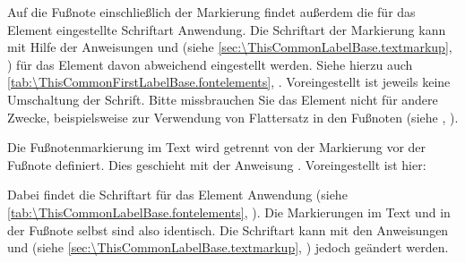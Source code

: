 \BeginIndexGroup
{}%
%
Auf%
 die Fußnote einschließlich der Markierung findet außerdem die für das
Element  eingestellte
Schriftart Anwendung. Die %
Schriftart der Markierung kann %
%
mit Hilfe der Anweisungen  und
 (siehe
\autoref{sec:\ThisCommonLabelBase.textmarkup},
) für das Element
 davon
abweichend eingestellt werden. Siehe hierzu auch
\autoref{tab:\ThisCommonFirstLabelBase.fontelements},
.  Voreingestellt ist
jeweils keine Umschaltung der Schrift.%
 Bitte missbrauchen Sie das Element nicht für andere
Zwecke, beispielsweise zur Verwendung von Flattersatz in den Fußnoten (siehe
,
).

%
%
Die Fußnotenmarkierung im Text wird getrennt von der Markierung vor der
Fußnote definiert. Dies geschieht mit der Anweisung
. Voreingestellt ist hier:
\begin{lstcode}
\end{lstcode}
Dabei findet%
 die Schriftart für das Element
%
 Anwendung (siehe %
\autoref{tab:\ThisCommonLabelBase.fontelements},
). Die Markierungen im Text
und in der Fußnote selbst sind also identisch. Die Schriftart kann mit den
Anweisungen  und
 (siehe
\autoref{sec:\ThisCommonLabelBase.textmarkup},
) jedoch geändert
werden.

